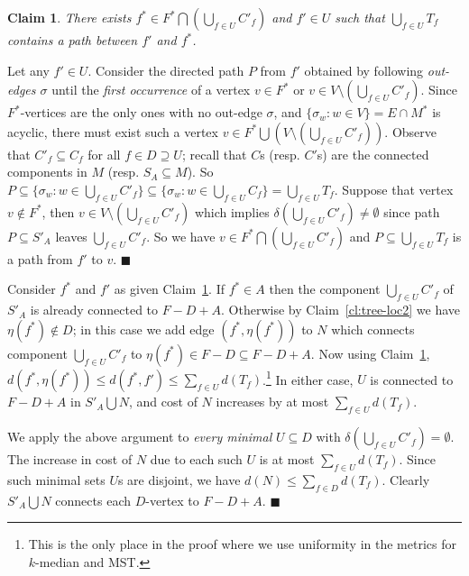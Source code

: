 \documentclass[11pt,twoside,a4paper]{article}
\newtheorem{claim}[theorem]{Claim}
\newenvironment{proof}{

\noindent{\bf Proof:}} {\hfill$\blacksquare$


}
\newcommand{\sse}{\subseteq}
\begin{document}
\begin{proof}
\begin{claim}\label{cl:tree-loc3}
There exists $f^*\in F^* \bigcap \left(\bigcup_{f\in U} C'_f\right)$ and $f'\in U$ such that $\bigcup_{f\in U} T_f$
contains a path between $f'$ and $f^*$.
\end{claim}
\begin{proof} Let any $f'\in U$. Consider the directed path $P$ from $f'$ obtained by following {\em out-edges $\sigma$} until the {\em first
occurrence} of  a vertex $v\in F^*$ or $v\in V\setminus \left(\bigcup_{f\in U} C'_f\right)$. Since $F^*$-vertices are
the only ones with no out-edge $\sigma$, and $\{\sigma_w : w\in V\}=E\cap M^*$ is acyclic, there must exist such a
vertex $v\in F^* \bigcup \left( V\setminus \left(\bigcup_{f\in U} C'_f\right)\right)$. Observe that $C'_f\sse C_f$ for
all $f\in D\supseteq U$; recall that $C$s (resp. $C'$s) are the connected components in $M$ (resp. $S_A\sse M$). So
$P\sse \{\sigma_w : w\in \bigcup_{f\in U} C'_f\}\sse  \{\sigma_w : w\in \bigcup_{f\in U} C_f\} = \bigcup_{f\in U} T_f$.
Suppose that vertex $v\not\in F^*$, then $v\in V\setminus \left(\bigcup_{f\in U} C'_f\right)$ which implies
$\delta\left(\bigcup_{f\in U} C'_f\right) \ne \emptyset$ since path $P\sse S'_A$ leaves $\bigcup_{f\in U} C'_f$. So we
have $v\in F^* \bigcap \left(\bigcup_{f\in U} C'_f\right)$ and $P\sse \bigcup_{f\in U} T_f$ is a path from $f'$ to $v$.
\end{proof}

Consider $f^*$ and $f'$ as given Claim~\ref{cl:tree-loc3}. If $f^*\in A$ then the component $\bigcup_{f\in U} C'_f$ of
$S'_A$ is already connected to $F-D+A$. Otherwise by Claim~\ref{cl:tree-loc2} we have $\eta(f^*)\not\in D$; in this
case we add edge $\left(f^*,\eta(f^*)\right)$ to $N$ which connects component $\bigcup_{f\in U} C'_f$ to $\eta(f^*)\in
F-D\sse F-D+A$. Now using Claim~\ref{cl:tree-loc3}, $d\left(f^*,\eta(f^*)\right)\le d(f^*,f')\le \sum_{f\in U}
d(T_f)$.\footnote{This is the only place in the proof where we use uniformity in the metrics for $k$-median and MST.}
In either case, $U$ is connected to $F-D+A$ in $S'_A\bigcup N$, and cost of $N$ increases by at most $\sum_{f\in U}
d(T_f)$.

We apply the above argument to {\em every minimal} $U\sse D$ with $\delta\left(\bigcup_{f\in U} C'_f\right)=\emptyset$.
The increase in cost of $N$ due to each such $U$ is at most $\sum_{f\in U} d(T_f)$. Since such minimal sets $U$s are
disjoint, we have $d(N)\le \sum_{f\in D} d(T_f)$. Clearly $S'_A\bigcup N$ connects each $D$-vertex to $F-D+A$.
\end{proof}
\medskip
\end{document}
